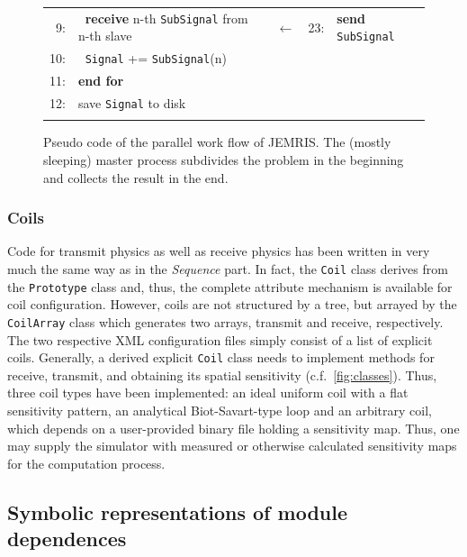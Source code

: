 \documentclass[journal,onecolumn,12pt]{IEEEtran}
\begin{document}
\begin{figure}[hbtb]
\begin{center}
{\begin{tabular}{|rlcrl|}
    9:&$\;\;${\bf receive} n-th \verb+SubSignal+ from n-th slave &$\longleftarrow$&23:&{\bf send} \verb+SubSignal+				\\
   10:&$\;\;$\verb+Signal+ += \verb+SubSignal+(n)				& &	   &							\\
   11:&{\bf end for}						& &	   &							\\
   12:&save \verb+Signal+ to disk				& &	   &							\\
      &								& &	   &							\\
   \hline
  \end{tabular}
  }
  \end{center}
  \caption{Pseudo code of the parallel work flow of JEMRIS. The (mostly sleeping) master process subdivides the problem
	   in the beginning and collects the result in the end. \label{fig:parcode}}
\end{figure}



\subsubsection{Coils}

Code for transmit physics as well as receive physics has been written in very much the same way as in the {\it Sequence}
part. In fact, the \verb+Coil+ class derives from the \verb+Prototype+ class and, thus, the complete attribute mechanism
is available for coil configuration. However, coils are not structured by a tree, but arrayed by the \verb+CoilArray+
class which generates two arrays, transmit and receive, respectively. The two respective XML configuration files simply
consist of a list of explicit coils. Generally, a derived explicit \verb+Coil+ class needs to implement methods for
receive, transmit, and obtaining its spatial sensitivity (c.f.~\ref{fig:classes}). Thus, three coil types have been
implemented: an ideal uniform coil with a flat sensitivity pattern, an analytical Biot-Savart-type loop and an arbitrary
coil, which depends on a user-provided binary file holding a sensitivity map. Thus, one may supply the simulator with
measured or otherwise calculated sensitivity maps for the computation process.



\subsection{Symbolic representations of module dependences}\label{ssec:symrep}
\end{document}
